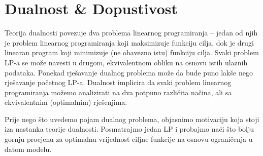 \documentclass[a4paper, utf8, 11pt, colorlinks]{book}
\begin{document}

  \newpage
 \chapter{Dualnost \& Dopustivost}
 
 Teorija dualnosti povezuje dva problema linearnog programiranja -- jedan od njih je problem linearnog programiranja koji maksimizuje funkciju cilja, dok je drugi linearan program  koji minimizuje (ne obavezno istu) funkciju cilja. Svaki problem LP-a se može navesti u drugom, ekvivalentnom obliku na osnovu istih ulaznih podataka. Ponekad rješavanje dualnog problema može da bude puno lakše nego rješavanje početnog LP-a.  Dualnost implicira da svaki problem linearnog programiranja možemo analizirati na dva potpuno različita načina, ali sa ekvivalentnim (optimalnim) rješenjima. 
 
 Prije nego što uvedemo pojam dualnog problema, objasnimo motivaciju koja stoji iza nastanka teorije dualnosti. Posmatrajmo jedan LP i probajmo naći što bolju gornju procjenu za optimalnu vrijednost ciljne funkcije na osnovu ograničenja u datom modelu.
 
\end{document}
